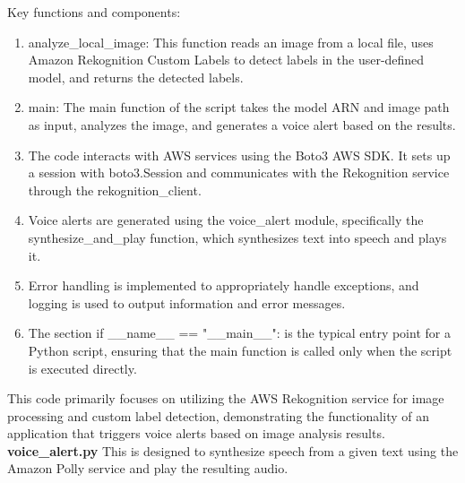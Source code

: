 Key functions and components:
\begin{enumerate}
    \item analyze\_local\_image: 
    This function reads an image from a local file, uses Amazon Rekognition Custom Labels to detect labels in the user-defined model, and returns the detected labels.\\
    \item main: 
    The main function of the script takes the model ARN and image path as input, analyzes the image, and generates a voice alert based on the results.\\
    \item The code interacts with AWS services using the Boto3 AWS SDK. It sets up a session with boto3.Session and communicates with the Rekognition service through the rekognition\_client.
    \item Voice alerts are generated using the voice\_alert module, specifically the synthesize\_and\_play function, which synthesizes text into speech and plays it.\\
    \item Error handling is implemented to appropriately handle exceptions, and logging is used to output information and error messages.\\
    \item The section if \_\_name\_\_ == "\_\_main\_\_": is the typical entry point for a Python script, ensuring that the main function is called only when the script is executed directly.\\
\end{enumerate}
This code primarily focuses on utilizing the AWS Rekognition service for image processing and custom label detection, demonstrating the functionality of an application that triggers voice alerts based on image analysis results.\\


\textbf{voice\_alert.py}
This is designed to synthesize speech from a given text using the Amazon Polly service and play the resulting audio.

